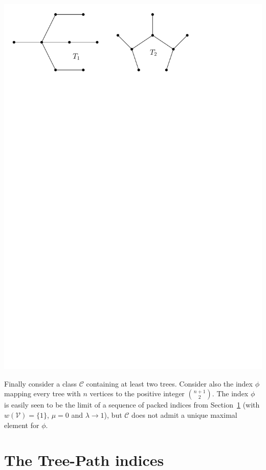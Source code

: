 \documentclass[11 pt]{modarticle}
\newcommand{\vset}{\mathcal{V}}
\newcommand{\wmap}{w}
\newcommand{\tclass}{\mathcal{C}}
\begin{document}
\begin{center}
	\includegraphics[scale=0.5]{figures/counter-example}
\end{center}

Finally consider a class $\tclass$ containing at least two trees. Consider also the index $\phi$ mapping every tree with $n$ vertices to the positive integer $\binom{n+1}{2}$. The index $\phi$ is easily seen to be the limit of a sequence of packed indices from Section~\ref{section:tp-indices} (with $\wmap(\vset)= \{1\}$, $\mu = 0$ and $\lambda \rightarrow 1$), but %
$\tclass$ does not admit a unique maximal element for $\phi$. 




\section{The Tree-Path indices}\label{section:tp-indices}
\end{document}
